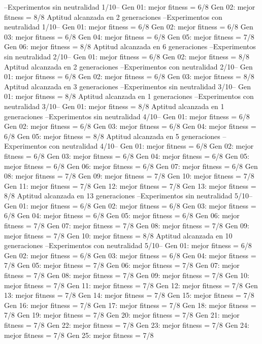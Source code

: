 --Experimentos sin neutralidad 1/10--
Gen 01: mejor fitness = 6/8
Gen 02: mejor fitness = 8/8
Aptitud alcanzada en 2 generaciones
--Experimentos con neutralidad 1/10--
Gen 01: mejor fitness = 6/8
Gen 02: mejor fitness = 6/8
Gen 03: mejor fitness = 6/8
Gen 04: mejor fitness = 6/8
Gen 05: mejor fitness = 7/8
Gen 06: mejor fitness = 8/8
Aptitud alcanzada en 6 generaciones
--Experimentos sin neutralidad 2/10--
Gen 01: mejor fitness = 6/8
Gen 02: mejor fitness = 8/8
Aptitud alcanzada en 2 generaciones
--Experimentos con neutralidad 2/10--
Gen 01: mejor fitness = 6/8
Gen 02: mejor fitness = 6/8
Gen 03: mejor fitness = 8/8
Aptitud alcanzada en 3 generaciones
--Experimentos sin neutralidad 3/10--
Gen 01: mejor fitness = 8/8
Aptitud alcanzada en 1 generaciones
--Experimentos con neutralidad 3/10--
Gen 01: mejor fitness = 8/8
Aptitud alcanzada en 1 generaciones
--Experimentos sin neutralidad 4/10--
Gen 01: mejor fitness = 6/8
Gen 02: mejor fitness = 6/8
Gen 03: mejor fitness = 6/8
Gen 04: mejor fitness = 6/8
Gen 05: mejor fitness = 8/8
Aptitud alcanzada en 5 generaciones
--Experimentos con neutralidad 4/10--
Gen 01: mejor fitness = 6/8
Gen 02: mejor fitness = 6/8
Gen 03: mejor fitness = 6/8
Gen 04: mejor fitness = 6/8
Gen 05: mejor fitness = 6/8
Gen 06: mejor fitness = 6/8
Gen 07: mejor fitness = 6/8
Gen 08: mejor fitness = 7/8
Gen 09: mejor fitness = 7/8
Gen 10: mejor fitness = 7/8
Gen 11: mejor fitness = 7/8
Gen 12: mejor fitness = 7/8
Gen 13: mejor fitness = 8/8
Aptitud alcanzada en 13 generaciones
--Experimentos sin neutralidad 5/10--
Gen 01: mejor fitness = 6/8
Gen 02: mejor fitness = 6/8
Gen 03: mejor fitness = 6/8
Gen 04: mejor fitness = 6/8
Gen 05: mejor fitness = 6/8
Gen 06: mejor fitness = 7/8
Gen 07: mejor fitness = 7/8
Gen 08: mejor fitness = 7/8
Gen 09: mejor fitness = 7/8
Gen 10: mejor fitness = 8/8
Aptitud alcanzada en 10 generaciones
--Experimentos con neutralidad 5/10--
Gen 01: mejor fitness = 6/8
Gen 02: mejor fitness = 6/8
Gen 03: mejor fitness = 6/8
Gen 04: mejor fitness = 7/8
Gen 05: mejor fitness = 7/8
Gen 06: mejor fitness = 7/8
Gen 07: mejor fitness = 7/8
Gen 08: mejor fitness = 7/8
Gen 09: mejor fitness = 7/8
Gen 10: mejor fitness = 7/8
Gen 11: mejor fitness = 7/8
Gen 12: mejor fitness = 7/8
Gen 13: mejor fitness = 7/8
Gen 14: mejor fitness = 7/8
Gen 15: mejor fitness = 7/8
Gen 16: mejor fitness = 7/8
Gen 17: mejor fitness = 7/8
Gen 18: mejor fitness = 7/8
Gen 19: mejor fitness = 7/8
Gen 20: mejor fitness = 7/8
Gen 21: mejor fitness = 7/8
Gen 22: mejor fitness = 7/8
Gen 23: mejor fitness = 7/8
Gen 24: mejor fitness = 7/8
Gen 25: mejor fitness = 7/8
